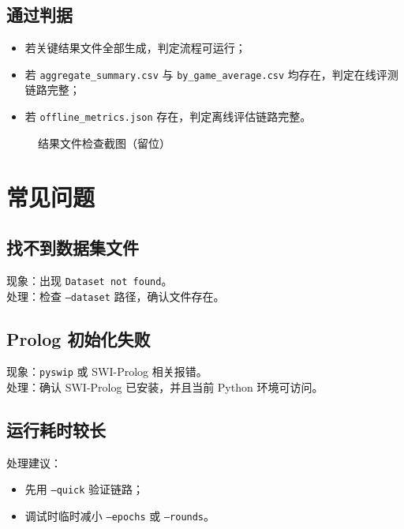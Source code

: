 \subsection{通过判据}
\begin{itemize}
    \item 若关键结果文件全部生成，判定流程可运行；
    \item 若 \texttt{aggregate\_summary.csv} 与 \texttt{by\_game\_average.csv} 均存在，判定在线评测链路完整；
    \item 若 \texttt{offline\_metrics.json} 存在，判定离线评估链路完整。
\end{itemize}

\begin{figure}[htbp]
    \centering
    \caption{结果文件检查截图（留位）}
    \label{fig:um_outputs_placeholder}
\end{figure}

\section{常见问题}

\subsection{找不到数据集文件}
现象：出现 \texttt{Dataset not found}。\\
处理：检查 \texttt{--dataset} 路径，确认文件存在。

\subsection{Prolog 初始化失败}
现象：\texttt{pyswip} 或 SWI-Prolog 相关报错。\\
处理：确认 SWI-Prolog 已安装，并且当前 Python 环境可访问。

\subsection{运行耗时较长}
处理建议：
\begin{itemize}
    \item 先用 \texttt{--quick} 验证链路；
    \item 调试时临时减小 \texttt{--epochs} 或 \texttt{--rounds}。
\end{itemize}
